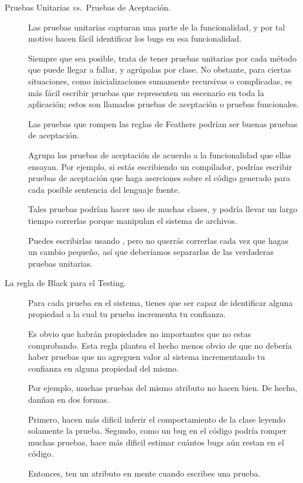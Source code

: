 \documentclass[a4paper,10pt,twoside]{book}
\begin{document}
\begin{description}
\item[Pruebas Unitarias \textit{vs.}\ Pruebas de Aceptaci\'on.] Las pruebas unitarias capturan una parte de la funcionalidad, y por tal motivo hacen f\'acil identificar los bugs en esa funcionalidad.
	
Siempre que sea posible, trata de tener pruebas unitarias por cada m\'etodo que puede llegar a fallar, y agr\'upalas por clase. No obstante, para ciertas situaciones, como inicializaciones sumamente recursivas o complicadas, es m\'as f\'acil escribir pruebas que representen un escenario en toda la aplicaci\'on; estos son llamados pruebas de aceptaci\'on o pruebas funcionales. 

Las pruebas que rompen las reglas de  Feathers podr\'ian ser buenas pruebas de aceptaci\'on.
	
Agrupa las pruebas de aceptaci\'on de acuerdo a la funcionalidad que ellas ensayan.
Por ejemplo, si est\'as escribiendo un compilador, podr\'ias escribir pruebas de aceptaci\'on que haga aserciones
sobre el c\'odigo generado para cada posible sentencia del lenguaje fuente. 

Tales pruebas podr\'ian hacer uso de muchas clases, y podr\'ia llevar un largo tiempo correrlas porque
manipulan el sistema de archivos.

Puedes escribirlas usando \sunit, pero no querr\'as correrlas cada vez que hagas un cambio peque\~no, 
as\'i que deber\'iamos separarlas de las verdaderas pruebas unitarias.
 
\item[La regla de Black para el Testing.]

Para cada prueba en el sistema, tienes que ser capaz de identificar alguna propiedad a la cual tu prueba incrementa tu confianza.

Es obvio que habr\'an propiedades no importantes que no estas comprobando.
Esta regla plantea el hecho menos obvio de que no deber\'ia haber pruebas que no agreguen valor al sistema incrementando tu confianza en alguna propiedad del mismo.

Por ejemplo, muchas pruebas del mismo atributo no hacen bien.
De hecho, dan\~nan en dos formas.

Primero, hacen m\'as dificil inferir el comportamiento de la clase leyendo solamente la prueba.
Segundo, como un bug en el c\'odigo podr\'ia romper muchas pruebas, hace m\'as dificil estimar cu\'antos bugs
a\'un restan en el c\'odigo.

Entonces, ten un atributo en mente cuando escribes una prueba.

\end{description}
\end{document}
